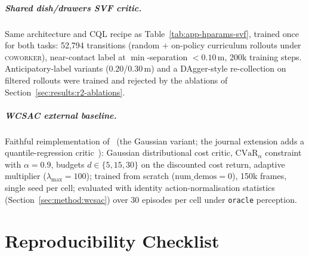 \documentclass[11pt,a4paper]{report}
\newcommand{\cvar}{\ensuremath{\mathrm{CVaR}}}
\newcommand{\coworker}{\textsc{coworker}}
\begin{document}
\paragraph{Shared dish/drawers SVF critic.}
Same architecture and CQL recipe as Table~\ref{tab:app-hparams-svf},
trained once for both tasks: 52{,}794 transitions
(random $+$ on-policy curriculum rollouts under \coworker{}),
near-contact label at $\min$-separation $< 0.10$\,m, 200k training
steps. Anticipatory-label variants (0.20/0.30\,m) and a
DAgger-style re-collection on filtered rollouts were trained and
rejected by the ablations of
Section~\ref{sec:results:r2-ablations}.

\paragraph{WCSAC external baseline.}
Faithful reimplementation of~\cite{yang2021wcsac} (the Gaussian
variant; the journal extension adds a quantile-regression
critic~\cite{yang2023wcsacjournal}): Gaussian
distributional cost critic, $\cvar{}_{\alpha}$ constraint with
$\alpha = 0.9$, budgets $d \in \{5, 15, 30\}$ on the discounted cost
return, adaptive multiplier ($\lambda_{\max} = 100$); trained from
scratch ($\text{num\_demos} = 0$), 150k frames, single seed per
cell; evaluated with identity action-normalisation statistics
(Section~\ref{sec:method:wcsac}) over 30 episodes per cell under
\texttt{oracle} perception.

\chapter{Reproducibility Checklist}
\label{app:repro}
\end{document}
